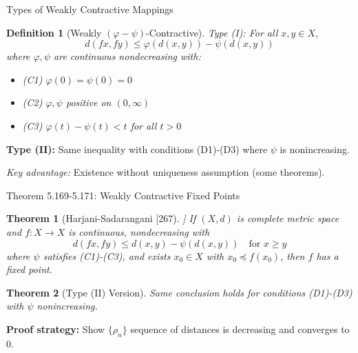 \documentclass[aspectratio=169,10pt]{beamer}
\theoremstyle{plain}
\newtheorem*{theorem*}{Theorem}
\newtheorem*{definition*}{Definition}
\begin{document}
\begin{frame}{Types of Weakly Contractive Mappings}
  \begin{definition*}[Weakly $(\varphi - \psi)$-Contractive]
    Type (I): For all $x,y \in X$,
    $$d(fx, fy) \leq \varphi(d(x,y)) - \psi(d(x,y))$$
    where $\varphi, \psi$ are continuous nondecreasing with:
    \begin{itemize}
      \item (C1) $\varphi(0) = \psi(0) = 0$
      \item (C2) $\varphi, \psi$ positive on $(0,\infty)$
      \item (C3) $\varphi(t) - \psi(t) < t$ for all $t > 0$
    \end{itemize}
  \end{definition*}

  \vspace{1em}

  \textbf{Type (II):} Same inequality with conditions (D1)-(D3) where $\psi$ is nonincreasing.

  \vspace{0.5em}

  \textit{Key advantage:} Existence without uniqueness assumption (some theorems).
\end{frame}

\begin{frame}{Theorem 5.169-5.171: Weakly Contractive Fixed Points}
  \begin{theorem*}[Harjani-Sadarangani [267]]
    If $(X, d)$ is complete metric space and $f: X \to X$ is continuous, nondecreasing with
    $$d(fx, fy) \leq d(x,y) - \psi(d(x,y)) \quad \text{for } x \geq y$$
    where $\psi$ satisfies (C1)-(C3), and exists $x_0 \in X$ with $x_0 \preceq f(x_0)$,
    then $f$ has a fixed point.
  \end{theorem*}

  \vspace{0.5em}

  \begin{theorem*}[Type (II) Version]
    Same conclusion holds for conditions (D1)-(D3) with $\psi$ nonincreasing.
  \end{theorem*}

  \vspace{1em}

  \textbf{Proof strategy:} Show $\{\rho_n\}$ sequence of distances is decreasing and converges to 0.
\end{frame}
\end{document}
